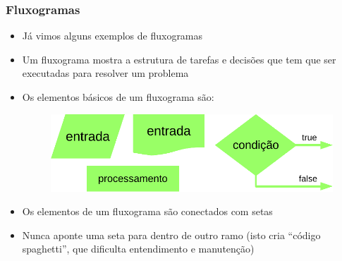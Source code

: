 \documentclass[xcolor={dvipsnames,table},aspectratio=169]{beamer}
\begin{document}
\begin{frame}\frametitle{Fluxogramas}
\begin{itemize}
	\item Já vimos alguns exemplos de fluxogramas
	\item Um fluxograma mostra a estrutura de tarefas e decisões que tem que ser executadas para resolver um problema
	\item Os elementos básicos de um fluxograma são:
\begin{figure}[h]
	\includegraphics[height=0.25\paperheight,center]{pucrs-ep-fprog-unidade_03-decisoes-laminas-elementos_de_fluxogramas.png}
\end{figure}
	\item Os elementos de um fluxograma são conectados com setas
	\item Nunca aponte uma seta para dentro de outro ramo (isto cria ``código spaghetti'', que dificulta entendimento e manutenção)
\end{itemize}
\end{frame}
\end{document}
